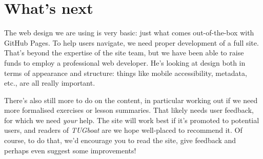 \documentclass[final]{ltugboat}
\begin{document}
\section{What's next}

The web design we are using is very basic: just what comes out-of-the-box with
GitHub Pages. To help users navigate, we need proper development of a full
site. That's beyond the expertise of the site team, but we have been able to
raise funds to employ a professional web developer. He's looking at design both
in terms of appearance and structure: things like mobile accessibility,
metadata, etc., are all really important.

There's also still more to do on the content, in particular working out if we
need more formalised exercises or lesson summaries. That likely needs user
feedback, for which we need \emph{your} help. The site will work best if it's
promoted to potential users, and readers of \emph{TUGboat} are we hope
well-placed to recommend it. Of course, to do that, we'd encourage you to read
the site, give feedback and perhaps even suggest some improvements!

\makesignature
\end{document}

